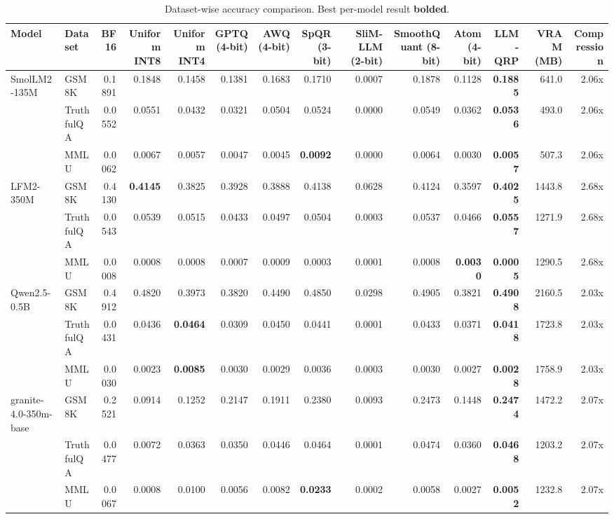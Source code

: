 \begin{table}[htbp]
  \centering
  \footnotesize
  \caption{Dataset-wise accuracy comparison. Best per-model result \textbf{bolded}.}
  \label{tab:dataset_wise}
  \begin{tabular}{llrrrrrrrrrrrr}
    \toprule
    \textbf{Model} & \textbf{Dataset} & \textbf{BF16} & \textbf{Uniform INT8} & \textbf{Uniform INT4} & \textbf{GPTQ (4-bit)} & \textbf{AWQ (4-bit)} & \textbf{SpQR (3-bit)} & \textbf{SliM-LLM (2-bit)} & \textbf{SmoothQuant (8-bit)} & \textbf{Atom (4-bit)} & \textbf{LLM-QRP} & \textbf{VRAM (MB)} & \textbf{Compression} \\
    \midrule
    SmolLM2-135M & GSM8K & 0.1891 & 0.1848 & 0.1458 & 0.1381 & 0.1683 & 0.1710 & 0.0007 & 0.1878 & 0.1128 & \textbf{0.1885} & 641.0 & 2.06x \\
     & TruthfulQA & 0.0552 & 0.0551 & 0.0432 & 0.0321 & 0.0504 & 0.0524 & 0.0000 & 0.0549 & 0.0362 & \textbf{0.0536} & 493.0 & 2.06x \\
     & MMLU & 0.0062 & 0.0067 & 0.0057 & 0.0047 & 0.0045 & \textbf{0.0092} & 0.0000 & 0.0064 & 0.0030 & \textbf{0.0057} & 507.3 & 2.06x \\
    \midrule
    LFM2-350M & GSM8K & 0.4130 & \textbf{0.4145} & 0.3825 & 0.3928 & 0.3888 & 0.4138 & 0.0628 & 0.4124 & 0.3597 & \textbf{0.4025} & 1443.8 & 2.68x \\
     & TruthfulQA & 0.0543 & 0.0539 & 0.0515 & 0.0433 & 0.0497 & 0.0504 & 0.0003 & 0.0537 & 0.0466 & \textbf{0.0557} & 1271.9 & 2.68x \\
     & MMLU & 0.0008 & 0.0008 & 0.0008 & 0.0007 & 0.0009 & 0.0003 & 0.0001 & 0.0008 & \textbf{0.0030} & \textbf{0.0005} & 1290.5 & 2.68x \\
    \midrule
    Qwen2.5-0.5B & GSM8K & 0.4912 & 0.4820 & 0.3973 & 0.3820 & 0.4490 & 0.4850 & 0.0298 & 0.4905 & 0.3821 & \textbf{0.4908} & 2160.5 & 2.03x \\
     & TruthfulQA & 0.0431 & 0.0436 & \textbf{0.0464} & 0.0309 & 0.0450 & 0.0441 & 0.0001 & 0.0433 & 0.0371 & \textbf{0.0418} & 1723.8 & 2.03x \\
     & MMLU & 0.0030 & 0.0023 & \textbf{0.0085} & 0.0030 & 0.0029 & 0.0036 & 0.0003 & 0.0030 & 0.0027 & \textbf{0.0028} & 1758.9 & 2.03x \\
    \midrule
    granite-4.0-350m-base & GSM8K & 0.2521 & 0.0914 & 0.1252 & 0.2147 & 0.1911 & 0.2380 & 0.0093 & 0.2473 & 0.1448 & \textbf{0.2474} & 1472.2 & 2.07x \\
     & TruthfulQA & 0.0477 & 0.0072 & 0.0363 & 0.0350 & 0.0446 & 0.0464 & 0.0001 & 0.0474 & 0.0360 & \textbf{0.0468} & 1203.2 & 2.07x \\
     & MMLU & 0.0067 & 0.0008 & 0.0100 & 0.0056 & 0.0082 & \textbf{0.0233} & 0.0002 & 0.0058 & 0.0027 & \textbf{0.0052} & 1232.8 & 2.07x \\
    \bottomrule
  \end{tabular}
\end{table}
